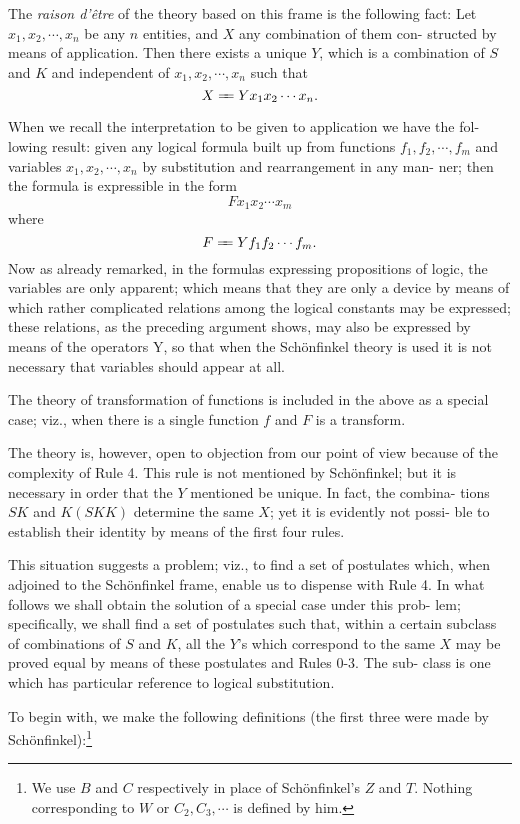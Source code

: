 \documentclass[10pt, twoside]{extarticle}
\newcommand{\td}[2][] {\todo[tickmarkheight=3pt, inline, size=\tiny, #1]{#2}}
\def\varequals#1{\mathrel{\leaders\hbox to3pt{$=$\hss}\hskip#1=}}
\newcommand\longeq{\varequals{0.4em}}
\theoremstyle{breaktheorem}
\theoremstyle{mylemma}
\theoremstyle{mydefinition}
\theoremstyle{mycorollary}
\begin{document}
The \textit{raison d'être} of the theory based on this frame is the following fact:
Let \(x_1, x_2,\cdots, x_n\) be any \(n\) entities, and \(X\) any combination of them con-
structed by means of application. Then there exists a unique \(Y\), which is a
combination of \(S\) and \(K\) and independent of \(x_1, x_2,\cdots, x_n\) such that
\[X \longeq Y x_1 x_2 \cdots x_n.\]

When we recall the interpretation to be given to application we have the fol-
lowing result: given any logical formula built up from functions \(f_1, f_2,\cdots, f_m\)
and variables \(x_1, x_2,\cdots, x_n\) by substitution and rearrangement in any man-
ner; then the formula is expressible in the form
\[Fx_1x_2\cdots x_m\]
where
\[F\longeq Yf_1f_2\cdots f_m.\]
Now as already remarked, in the formulas expressing propositions of logic,
the variables are only apparent; which means that they are only a device by
means of which rather complicated relations among the logical constants
may be expressed; these relations, as the preceding argument shows, may also
be expressed by means of the operators Y, so that when the Schönfinkel theory
is used it is not necessary that variables should appear at all.

The theory of transformation of functions is included in the above as a
special case; viz., when there is a single function \(f\) and \(F\) is a transform.

The theory is, however, open to objection from our point of view because
of the complexity of Rule 4\td{link}. This rule is not mentioned by Schönfinkel; but
it is necessary in order that the \(Y\) mentioned be unique. In fact, the combina-
tions \(SK\) and \(K(SKK)\) determine the same \(X\); yet it is evidently not possi-
ble to establish their identity by means of the first four rules.

This situation suggests a problem; viz., to find a set of postulates which,
when adjoined to the Schönfinkel frame, enable us to dispense with Rule 4.
In what follows we shall obtain the solution of a special case under this prob-
lem; specifically, we shall find a set of postulates such that, within a certain
subclass of combinations of \(S\) and \(K\), all the \(Y\)'s which correspond
to the same \(X\) may be proved equal by means of these postulates and Rules 0-3. The sub-
class is one which has particular reference to logical substitution.

To begin with, we make the following definitions (the first three were made by Schönfinkel):\footnote{We use \(B\) and \(C\) respectively in place of Schönfinkel's \(Z\) and \(T\). Nothing corresponding to \(W\) or \(C_2, C_3, \cdots\) is defined by him.}
\end{document}
